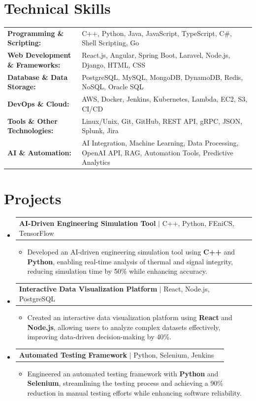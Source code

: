 \documentclass[letterpaper,10pt]{article}
\makeatletter
\newcommand{\resumeItem}[1]{
  \item{\fontsize{8pt}{9pt}\selectfont
    #1 \vspace{-3pt}
  }
}
\newcommand{\resumeProjectHeading}[2]{
    \item
    \begin{tabular*}{1.001\textwidth}{l@{\extracolsep{\fill}}r}
      \fontsize{8.5pt}{10pt}#1 & \textbf{\fontsize{8.5pt}{10pt} #2}\\
    \end{tabular*}\vspace{-7pt}
}
\newcommand{\resumeSubHeadingListStart}{\begin{itemize}[leftmargin=0pt, label={}]}
\newcommand{\resumeSubHeadingListEnd}{\end{itemize}}
\newcommand{\resumeItemListStart}{\begin{itemize}[leftmargin=*]}
\newcommand{\resumeItemListEnd}{\end{itemize}\vspace{-5pt}}
\makeatother
\begin{document}
\section{Technical Skills}
        \vspace{-14pt}
        \begin{table}[h]
            \fontsize{8pt}{9pt}\selectfont
            \begin{tabular}{p{0.3\linewidth} p{0.7\linewidth}}
                \textbf{Programming \& Scripting:} & C++, Python, Java, JavaScript, TypeScript, C\#, Shell Scripting, Go \\
                \textbf{Web Development \& Frameworks:} & React.js, Angular, Spring Boot, Laravel, Node.js, Django, HTML, CSS \\
                \textbf{Database \& Data Storage:} & PostgreSQL, MySQL, MongoDB, DynamoDB, Redis, NoSQL, Oracle SQL \\
                \textbf{DevOps \& Cloud:} & AWS, Docker, Jenkins, Kubernetes, Lambda, EC2, S3, CI/CD \\
                \textbf{Tools \& Other Technologies:} & Linux/Unix, Git, GitHub, REST API, gRPC, JSON, Splunk, Jira \\
                \textbf{AI \& Automation:} & AI Integration, Machine Learning, Data Processing, OpenAI API, RAG, Automation Tools, Predictive Analytics \\
            \end{tabular}
        \end{table}
 \vspace{-18pt}

\section{Projects}
    \vspace{-5pt}
    \resumeSubHeadingListStart
          \resumeProjectHeading
            {\textbf{AI-Driven Engineering Simulation Tool} $|$ C++, Python, FEniCS, TensorFlow}{}
            \resumeItemListStart
                \resumeItem{Developed an AI-driven engineering simulation tool using \textbf{C++} and \textbf{Python}, enabling real-time analysis of thermal and signal integrity, reducing simulation time by 50\% while enhancing accuracy.}
            \resumeItemListEnd
        \vspace{-12pt}
    
        \resumeProjectHeading
            {\textbf{Interactive Data Visualization Platform} $|$ React, Node.js, PostgreSQL}{}
        \resumeItemListStart
                \resumeItem{Created an interactive data visualization platform using \textbf{React} and \textbf{Node.js}, allowing users to analyze complex datasets effectively, improving data-driven decision-making by 40\%.}
        \resumeItemListEnd
      \vspace{-12pt}
      \resumeProjectHeading
        {\textbf{Automated Testing Framework} $|$ Python, Selenium, Jenkins}{}
    \resumeItemListStart
            \resumeItem{Engineered an automated testing framework with \textbf{Python} and \textbf{Selenium}, streamlining the testing process and achieving a 90\% reduction in manual testing efforts while enhancing software reliability.}
    \resumeItemListEnd
    \resumeSubHeadingListEnd
\end{document}
